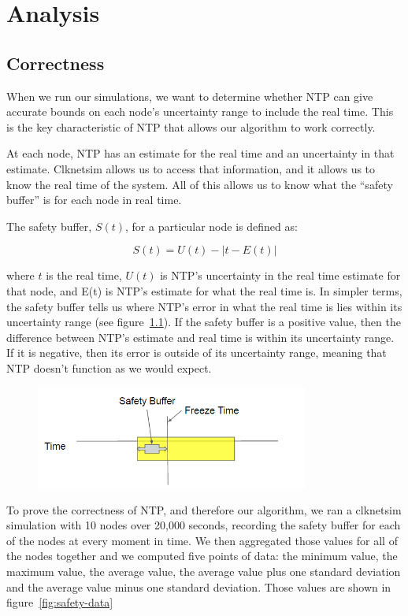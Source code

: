 \chapter{Analysis}
\label{sec:analysis}

\section{Correctness}

When we run our simulations, we want to determine whether NTP can give
accurate bounds on each node's uncertainty range to include the real
time. This is the key characteristic of NTP that allows our algorithm
to work correctly.

At each node, NTP has an estimate for the real time and an uncertainty
in that estimate. Clknetsim allows us to access that information, and
it allows us to know the real time of the system. All of this allows
us to know what the “safety buffer” is for each node in real time.

The safety buffer, $S(t)$,  for a particular node is defined as:

\[ S(t) = U(t) - | t - E(t)| \]

where $t$ is the real time, $U(t)$ is NTP's uncertainty in the real
time estimate for that node, and E(t) is NTP's estimate for what the
real time is. In simpler terms, the safety buffer tells us where NTP's
error in what the real time is lies within its uncertainty range (see
figure~\ref{fig:safety-diag}). If the safety buffer is a positive
value, then the difference between NTP's estimate and real time is
within its uncertainty range. If it is negative, then its error is
outside of its uncertainty range, meaning that NTP doesn't function as
we would expect.

\begin{figure}[h]
  \caption{} %
  \label{fig:safety-diag}
  \centering
  \includegraphics[width=0.8\textwidth]{safety-diagram.png}
\end{figure}

To prove the correctness of NTP, and therefore our algorithm, we ran a
clknetsim simulation with 10 nodes over 20,000 seconds, 
recording the safety buffer for each of the nodes at
every moment in time. We then aggregated those values for all of the
nodes together and we computed five points of data: the minimum value,
the maximum value, the average value, the average value plus one
standard deviation and the average value minus one standard
deviation. Those values are shown in figure~\ref{fig:safety-data}

